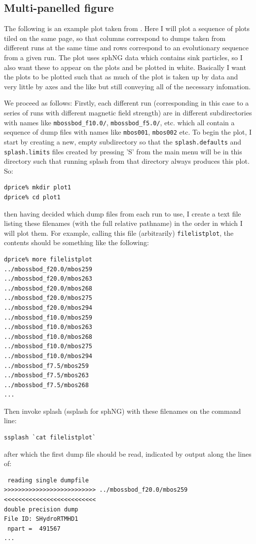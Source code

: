 \documentclass[a4paper,11pt]{article}
\begin{document}
\subsection{Multi-panelled figure}
 The following is an example plot taken from \citet{pb07}. Here I will plot a sequence of plots tiled on the same page, so that columns correspond to dumps taken from different runs at the same time and rows correspond to an evolutionary sequence from a given run. The plot uses sphNG data which contains sink particles, so I also want these to appear on the plots and be plotted in white. Basically I want the plots to be plotted such that as much of the plot is taken up by data and very little by axes and the like but still conveying all of the necessary infomation.
 
 We proceed as follows: Firstly, each different run (corresponding in this case to a series of runs with different magnetic field strength) are in different subdirectories with names like \verb+mbossbod_f10.0/+, \verb+mbossbod_f5.0/+, etc. which all contain a sequence of dump files with names like \verb+mbos001+, \verb+mbos002+ etc. To begin the plot, I start by creating a new, empty subdirectory so that the \verb+splash.defaults+ and \verb+splash.limits+ files created by pressing 'S' from the main menu will be in this directory such that running splash from that directory always produces this plot. So:
\begin{verbatim}
dprice% mkdir plot1
dprice% cd plot1
\end{verbatim}
then having decided which dump files from each run to use, I create a text file listing these filenames (with the full relative pathname) in the order in which I will plot them. For example, calling this file (arbitrarily) \verb+filelistplot+, the contents should be something like the following:
\begin{verbatim}
dprice% more filelistplot 
../mbossbod_f20.0/mbos259
../mbossbod_f20.0/mbos263
../mbossbod_f20.0/mbos268
../mbossbod_f20.0/mbos275
../mbossbod_f20.0/mbos294
../mbossbod_f10.0/mbos259
../mbossbod_f10.0/mbos263
../mbossbod_f10.0/mbos268
../mbossbod_f10.0/mbos275
../mbossbod_f10.0/mbos294
../mbossbod_f7.5/mbos259
../mbossbod_f7.5/mbos263
../mbossbod_f7.5/mbos268
...
\end{verbatim}
 Then invoke splash (ssplash for sphNG) with these filenames on the command line:
\begin{verbatim}
ssplash `cat filelistplot`
\end{verbatim}
after which the first dump file should be read, indicated by output along the lines of:
\begin{verbatim}
 reading single dumpfile
>>>>>>>>>>>>>>>>>>>>>>>>>> ../mbossbod_f20.0/mbos259 <<<<<<<<<<<<<<<<<<<<<<<<<<
double precision dump
File ID: SHydroRTMHD1
 npart =  491567
...
\end{verbatim}
\end{document}
